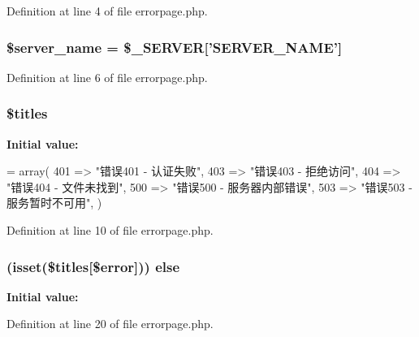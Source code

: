 Definition at line 4 of file errorpage.\+php.

\hypertarget{errorpage_8php_a26d95fc7e65c52080643099fed9f0057}{
\subsubsection[{\$server\+\_\+name}]{\setlength{\rightskip}{0pt plus 5cm}\$server\+\_\+name = \$\+\_\+\+S\+E\+R\+V\+E\+R\mbox{[}'S\+E\+R\+V\+E\+R\+\_\+\+N\+A\+M\+E'\mbox{]}}}\label{errorpage_8php_a26d95fc7e65c52080643099fed9f0057}


Definition at line 6 of file errorpage.\+php.

\hypertarget{errorpage_8php_a26c001c5d5d900be2bebf55257d9cdfb}{
\subsubsection[{\$titles}]{\setlength{\rightskip}{0pt plus 5cm}\$titles}}\label{errorpage_8php_a26c001c5d5d900be2bebf55257d9cdfb}
{\bfseries Initial value\+:}
\begin{DoxyCode}
= array(
                            401 => \textcolor{stringliteral}{"错误401 - 认证失败"},
                            403 => \textcolor{stringliteral}{"错误403 - 拒绝访问"},
                            404 => \textcolor{stringliteral}{"错误404 - 文件未找到"},
                            500 => \textcolor{stringliteral}{"错误500 - 服务器内部错误"},
                            503 => \textcolor{stringliteral}{"错误503 - 服务暂时不可用"},
                            )
\end{DoxyCode}


Definition at line 10 of file errorpage.\+php.

\hypertarget{errorpage_8php_ac9c33c396cfda3d13179fe40c78be2ff}{
\subsubsection[{else}]{ (isset(\$titles\mbox{[}\$error\mbox{]})) else}}\label{errorpage_8php_ac9c33c396cfda3d13179fe40c78be2ff}
{\bfseries Initial value\+:}


Definition at line 20 of file errorpage.\+php.


